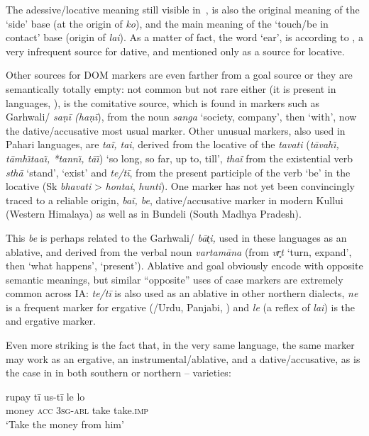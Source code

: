 \documentclass[output=paper]{LSP/langsci}
\begin{document}
The adessive/locative meaning still visible in~, is also the original meaning of the ‘side’ base (at the origin of \textit{ko}), and the main meaning of the ‘touch/be in contact’ base (origin of \textit{lai}). As a matter of fact, the word ‘ear’, is according to \citet[121]{Heineetal2002World}, a very infrequent source for dative, and mentioned only as a source for locative.

Other sources for DOM markers are even farther from a goal source or they are semantically totally empty: not common but not rare either (it is present in  languages, \cf \citealt{Chappell2014Sources}), is the comitative source, which is found in markers such as Garhwali/ \textit{saṇī (haṇī}), from the  noun \textit{sanga} ‘society, company’, then ‘with’, now the dative/accusative most usual marker. Other unusual markers, also used in Pahari languages, are \textit{taĩ, tai}, derived from the locative of the  \textit{tavati} (\textit{tāvah\~\i, tāmh\~\i *taa\~\i, *tann\~\i, tā\~\i}) ‘so long, so far, up to, till’, \textit{thaĩ} from the existential verb \textit{sthā} ‘stand’, ‘exist’ and \textit{te/tī}, from the present participle of the verb ‘be’ in the locative (Sk \textit{bhavati} > \textit{hontai}, \textit{hunti}). One marker has not yet been convincingly traced to a reliable origin, \textit{baĩ, be}, dative/accusative marker in modern Kullui (Western Himalaya) as well as in Bundeli (South Madhya Pradesh).

This \textit{be} is perhaps related to the Garhwali/ \textit{bāt̩i,} used in these languages as an ablative, and derived from the verbal noun \textit{vartamāna} (from  \textit{vr̥t} ‘turn, expand’, then ‘what happens’, ‘present’). Ablative and goal obviously encode with opposite semantic meanings, but similar “opposite” uses of case markers are extremely common across IA: \textit{te/tī} is also used as an ablative in other northern dialects, \textit{ne} is a frequent marker for ergative (/Urdu, Panjabi, ) and \textit{le} (a reflex of \textit{lai}) is the  and  ergative marker.

Even more striking is the fact that, in the very same language, the same marker may work as an ergative, an instrumental/ablative, and a dative/accusative, as is the case in  in both southern  or northern -- varieties: 

\ea {}
\label{10-mo-ex:59}
\ea \label{10-mo-ex:59a}
\gll rupay tī us-tī le lo\\
 money \textsc{acc} \textsc{3sg-abl} take take.\textsc{imp}\\
\glt ‘Take the money from him’ \citep[177]{Tiwari1955Hindi}
\end{document}
